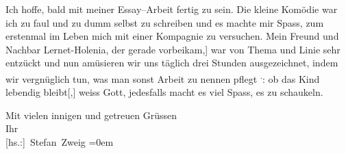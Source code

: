 \pstart
           Ich hoffe, bald mit meiner Essay–Arbeit fertig zu sein. Die kleine Komödie war ich zu faul und zu dumm selbst zu schreiben und es
            macht\introOben{}e\introOben{} mir Spass, zum erstenmal im Leben mich mit einer
          Kompagnie zu versuchen. Mein Freund und Nachbar Lernet-Holenia\introOben{}, der gerade vorbeikam\introOben{}{[},{]} war von Thema und Linie sehr entzückt und nun amüsieren wir uns
          täglich drei Stunden ausgezeichnet, indem wir vergnüglich tun, was man sonst Arbeit zu
          nennen pflegt \substVorne{}\textsuperscript{.}\substDazwischen{}: ob das Kind lebendig bleibt{[},{]} weiss Gott,
              jedesfalls macht es viel Spass, es zu schaukeln.\substHinten{}\pend
           
\pstart
           Mit vielen innigen und getreuen Grüssen{\\[\baselineskip]}Ihr{\\[\baselineskip]}\spacefill\mbox{{[}hs.:{]} Stefan Zweig}\pend
           \leftskip=0em{}\endnumbering{}
\begin{anhang}
\end{anhang}
      